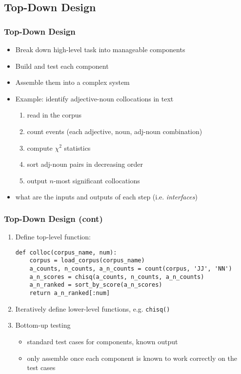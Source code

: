 \documentclass{beamer}             %
\begin{document}
\subsection{Top-Down Design}

\begin{frame}
\frametitle{Top-Down Design}
\begin{itemize}
\item Break down high-level task into manageable components
\item Build and test each component
\item Assemble them into a complex system
\item Example: identify adjective-noun collocations in text
  \begin{enumerate}
  \item read in the corpus
  \item count events (each adjective, noun, adj-noun combination)
  \item compute $\chi^2$ statistics
  \item sort adj-noun pairs in decreasing order
  \item output $n$-most significant collocations
  \end{enumerate}
\item what are the inputs and outputs of each step (i.e. \textit{interfaces})
\end{itemize}
\end{frame}

\begin{frame}[fragile]
\frametitle{Top-Down Design (cont)}

\begin{enumerate}
\item Define top-level function:

\begin{verbatim}
def colloc(corpus_name, num):
    corpus = load_corpus(corpus_name)
    a_counts, n_counts, a_n_counts = count(corpus, 'JJ', 'NN')
    a_n_scores = chisq(a_counts, n_counts, a_n_counts)
    a_n_ranked = sort_by_score(a_n_scores)
    return a_n_ranked[:num]
\end{verbatim}

\item Iteratively define lower-level functions, e.g. \texttt{chisq()}

\item Bottom-up testing
\begin{itemize}
\item standard test cases for components, known output
\item only assemble once each component is known to work correctly
  on the test cases
\end{itemize}
\end{enumerate}
\end{frame}
\end{document}
